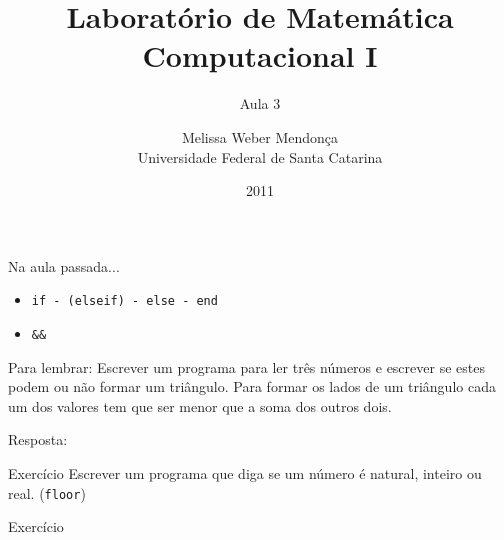 \documentclass[hyperref={pdfpagelabels=false}]{beamer}
\title{Laboratório de Matemática Computacional I}
\subtitle{Aula 3}
\author[M. Weber Mendonça]{Melissa Weber Mendonça\\
Universidade Federal de Santa Catarina}
\date{2011}
\begin{document}
\setmonofont{Inconsolata}

\begin{frame}
  \titlepage
\end{frame}

\begin{frame}{Na aula passada...}
  \begin{itemize}
  \item {\texttt{if - (elseif) - else - end}}
  \item {\texttt{\&\&}}      
  \end{itemize}
\end{frame}

\begin{frame}{Para lembrar:}
  Escrever um programa para ler três números e escrever se estes podem ou não formar um triângulo. Para formar os lados de um triângulo cada um dos valores tem que ser menor que a soma dos outros dois.
\end{frame}

\begin{frame}{Resposta:}
  \begin{center}
    \begin{minipage}{0.95\textwidth}
      
    \end{minipage}
  \end{center}
\end{frame}

\begin{frame}{Exercício}
  Escrever um programa que diga se um número é natural, inteiro ou real. ({\texttt{floor}})
  \begin{center}
    \begin{minipage}{0.8\textwidth}
    \end{minipage}
  \end{center}
\end{frame}

\begin{frame}{Exercício}
\end{frame}
\end{document}
